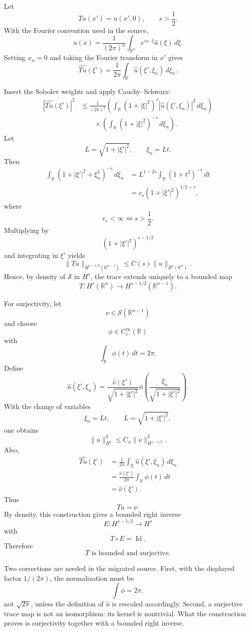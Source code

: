 \begin{solution}
Let
\[
Tu(x')=u(x',0),
\qquad
s>\frac12.
\]
With the Fourier convention used in the source,
\[
u(x)
=
\frac1{(2\pi)^n}
\int_{\mathbb R^n}
e^{ix\cdot\xi}\widehat u(\xi)\,d\xi.
\]
Setting \(x_n=0\) and taking the Fourier transform in \(x'\) gives
\[
\boxed{
\widehat{Tu}(\xi')
=
\frac1{2\pi}
\int_{\mathbb R}
\widehat u(\xi',\xi_n)\,d\xi_n.
}
\]

Insert the Sobolev weights and apply Cauchy--Schwarz:
\[
\begin{aligned}
|\widehat{Tu}(\xi')|^2
&\le
\frac1{(2\pi)^2}
\left(
\int_{\mathbb R}
(1+|\xi|^2)^s
|\widehat u(\xi',\xi_n)|^2\,d\xi_n
\right)\\
&\qquad\times
\left(
\int_{\mathbb R}
(1+|\xi|^2)^{-s}\,d\xi_n
\right).
\end{aligned}
\]
Let
\[
L=\sqrt{1+|\xi'|^2},
\qquad
\xi_n=Lt.
\]
Then
\[
\begin{aligned}
\int_{\mathbb R}
(1+|\xi'|^2+\xi_n^2)^{-s}\,d\xi_n
&=
L^{1-2s}
\int_{\mathbb R}(1+t^2)^{-s}\,dt\\
&=
c_s(1+|\xi'|^2)^{1/2-s},
\end{aligned}
\]
where
\[
c_s<\infty
\iff
s>\frac12.
\]
Multiplying by
\[
(1+|\xi'|^2)^{s-1/2}
\]
and integrating in \(\xi'\) yields
\[
\boxed{
\|Tu\|_{H^{s-1/2}(\mathbb R^{n-1})}
\le
C(s)\|u\|_{H^s(\mathbb R^n)}.
}
\]
Hence, by density of \(\mathcal S\) in \(H^s\), the trace extends uniquely to a bounded map
\[
\boxed{
T:H^s(\mathbb R^n)
\to
H^{s-1/2}(\mathbb R^{n-1}).
}
\]

For surjectivity, let
\[
\nu\in\mathcal S(\mathbb R^{n-1})
\]
and choose
\[
\phi\in C_c^\infty(\mathbb R)
\]
with
\[
\int_{\mathbb R}\phi(t)\,dt=2\pi.
\]
Define
\[
\widehat u(\xi',\xi_n)
=
\frac{\widehat\nu(\xi')}{\sqrt{1+|\xi'|^2}}
\phi\left(
\frac{\xi_n}{\sqrt{1+|\xi'|^2}}
\right).
\]
With the change of variables
\[
\xi_n=L t,
\qquad
L=\sqrt{1+|\xi'|^2},
\]
one obtains
\[
\|u\|_{H^s}^2
\le
C_\phi
\|\nu\|_{H^{s-1/2}}^2.
\]
Also,
\[
\begin{aligned}
\widehat{Tu}(\xi')
&=
\frac1{2\pi}
\int_{\mathbb R}
\widehat u(\xi',\xi_n)\,d\xi_n\\
&=
\frac{\widehat\nu(\xi')}{2\pi}
\int_{\mathbb R}\phi(t)\,dt\\
&=
\widehat\nu(\xi').
\end{aligned}
\]
Thus
\[
Tu=\nu.
\]
By density, this construction gives a bounded right inverse
\[
E:H^{s-1/2}\to H^s
\]
with
\[
T\circ E=\operatorname{Id}.
\]
Therefore
\[
\boxed{
T\text{ is bounded and surjective}.
}
\]

Two corrections are needed in the migrated source. First, with the displayed factor
\(1/(2\pi)\), the normalization must be
\[
\int\phi=2\pi,
\]
not \(\sqrt{2\pi}\), unless the definition of \(\widehat u\) is rescaled accordingly.
Second, a surjective trace map is not an isomorphism: its kernel is nontrivial. What the
construction proves is surjectivity together with a bounded right inverse.
\end{solution}


